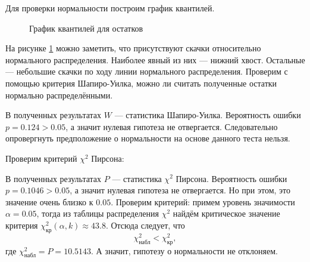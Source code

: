 Для проверки нормальности построим график квантилей.
\begin{figure}[ht]
\caption{График квантилей для остатков}
\label{img:resid_qqnorm}
\end{figure}
На рисунке \ref{img:resid_qqnorm} можно заметить, что присутствуют скачки относительно нормального распределения. Наиболее явный из них --- нижний хвост. Остальные --- небольшие скачки по ходу линии нормального распределения. Проверим с помощью критерия Шапиро-Уилка, можно ли считать полученные остатки нормально распределёнными.

В полученных результатах $W$ --- статистика Шапиро-Уилка. Вероятность ошибки $p = 0.124 > 0.05$, а значит нулевая гипотеза не отвергается. Следовательно опровергнуть предположение о нормальности на основе данного теста нельзя.

\bigskip
\bigskip
Проверим критерий $\chi^2$ Пирсона:
\bigskip

В полученных результатах $P$ --- статистика $\chi^2$ Пирсона. Вероятность ошибки $p = 0.1046 > 0.05$, а значит нулевая гипотеза не отвергается. Но при этом, это значение очень близко к $0.05$. Проверим критерий: примем уровень значимости $\alpha = 0.05$, тогда из таблицы распределения $\chi^2$ найдём критическое значение критерия $\chi_{\textrm{кр}}^2(\alpha, k) \approx 43.8$. Отсюда следует, что
\begin{equation*}
	\chi_{\textrm{набл}}^2 < \chi_{\textrm{кр}}^2,
\end{equation*}
где $\chi_{\textrm{набл}}^2 = P = 10.5143$. А значит, гипотезу о нормальности не отклоняем. 

